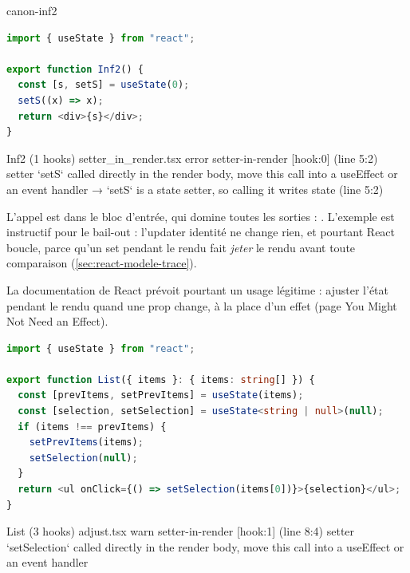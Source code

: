 \begin{exemple}{}{canon-inf2}
\begin{lstlisting}[language=TypeScript,caption={\code{Inf2} : l'updater identité, appelé dans le corps (\file{/tmp/ch02/setter_in_render.tsx})},label={lst:react-modele-inf2}]
import { useState } from "react";

export function Inf2() {
  const [s, setS] = useState(0);
  setS((x) => x);
  return <div>{s}</div>;
}
\end{lstlisting}
\begin{sortie}
  Inf2  (1 hooks)  setter_in_render.tsx
    error  setter-in-render  [hook:0]  (line 5:2)  setter `setS` called directly in the render body, move this call into a useEffect or an event handler
       → `setS` is a state setter, so calling it writes state (line 5:2)
\end{sortie}
\end{exemple}

L'appel est dans le bloc d'entrée, qui domine toutes les sorties : \Error.
L'exemple est instructif pour le bail-out : l'updater identité ne change rien,
et pourtant React boucle, parce qu'un set pendant le rendu fait \emph{jeter} le
rendu avant toute comparaison (\cref{sec:react-modele-trace}).

La documentation de React prévoit pourtant un usage légitime : \og ajuster
l'état pendant le rendu\fg{} quand une prop change, à la place d'un effet
(page \og You Might Not Need an Effect\fg{}).

\begin{lstlisting}[language=TypeScript,caption={\code{List} : le motif « adjust state during render » (\file{/tmp/ch02/adjust.tsx})},label={lst:react-modele-adjust}]
import { useState } from "react";

export function List({ items }: { items: string[] }) {
  const [prevItems, setPrevItems] = useState(items);
  const [selection, setSelection] = useState<string | null>(null);
  if (items !== prevItems) {
    setPrevItems(items);
    setSelection(null);
  }
  return <ul onClick={() => setSelection(items[0])}>{selection}</ul>;
}
\end{lstlisting}

\begin{sortie}
  List  (3 hooks)  adjust.tsx
    warn   setter-in-render  [hook:1]  (line 8:4)  setter `setSelection` called directly in the render body, move this call into a useEffect or an event handler
\end{sortie}

